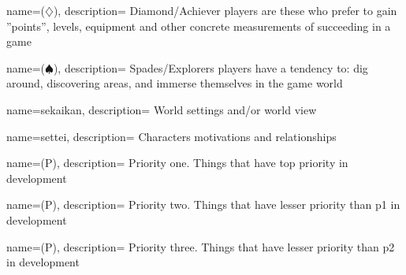 %
%
%

\usepackage{glossaries}

\makeglossaries

{
	name=($\diamondsuit$),
	description=
	{
Diamond/Achiever players are these who prefer to gain ”points”, levels,
equipment and other concrete measurements of succeeding in a game
	}
}

{
	name=($\spadesuit$),
	description=
	{
Spades/Explorers players have a tendency to: dig around, discovering
areas, and immerse themselves in the game world
	}
}

{
	name=sekaikan,
	description=
	{
World settings and/or world view
	}
}

{
	name=settei,
	description=
	{
Characters motivations and relationships
	}
}

{
	name=(P),
	description=
	{
Priority one. Things that have top priority in development
	}
}

{
	name=(P),
	description=
	{
Priority two. Things that have lesser priority than \gls{p1} in development
	}
}

{
	name=(P),
	description=
	{
Priority three. Things that have lesser priority than \gls{p2} in development
	}
}


